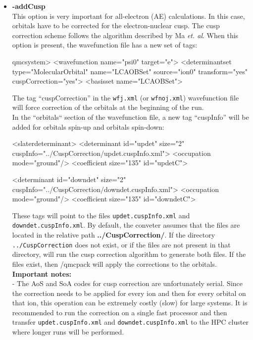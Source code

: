 \begin{itemize}
\begin{itemize}
\end{itemize}


\item \textbf{-addCusp} \\ This option is very important for
  all-electron (AE) calculations. In this case, orbitals have to be
  corrected for the electron-nuclear cusp. The cusp correction scheme
  follows the algorithm described by Ma \textit{et. al}. \cite{Ma2005}
  When this option is present, the wavefunction file has a new set of
  tags:

\begin{shade}
 qmcsystem>
  <wavefunction name="psi0" target="e">
    <determinantset type="MolecularOrbital" name="LCAOBSet" source="ion0"
      transform="yes" cuspCorrection="yes">
      <basisset name="LCAOBSet">
\end{shade}

The tag ``cuspCorrection'' in the \texttt{wfj.xml} (or \texttt{wfnoj.xml}) wavefunction file will force correction of the orbitals at the beginning of the \qmcpack run. \\
In the ``orbitals`` section of the wavefunction file, a new tag ``cuspInfo'' will be added for orbitals spin-up and orbitals spin-down:

\begin{shade}
   <slaterdeterminant>
        <determinant id="updet" size="2"
            cuspInfo="../CuspCorrection/updet.cuspInfo.xml">
          <occupation mode="ground"/>
          <coefficient size="135" id="updetC">
          
  <determinant id="downdet" size="2"
           cuspInfo="../CuspCorrection/downdet.cuspInfo.xml">
          <occupation mode="ground"/>
          <coefficient size="135" id="downdetC">
\end{shade}

These tags will point to the files \texttt{updet.cuspInfo.xml} and
\texttt{downdet.cuspInfo.xml}. By default, the conveter assumes that
the files are located in the relative path
\textbf{../CuspCorrection/}. If the directory
\texttt{../CuspCorrection} does not exist, or if the files are not
present in that directory, \qmcpack will run the cusp correction
algorithm to generate both files.  If the files exist, then /qmcpack
will apply the corrections to the orbitals. \\

\textbf{Important notes:}\\
- The AoS and SoA codes for cusp correction are unfortunately serial. Since the correction needs to be applied for every ion and then for every orbital on that ion, this operation can be extremely costly (slow) for large systems. It is recommended to run the correction on a single fast processor and then transfer \texttt{updet.cuspInfo.xml} and \texttt{downdet.cuspInfo.xml} to the HPC cluster where longer runs will be performed. \\


\end{itemize}
